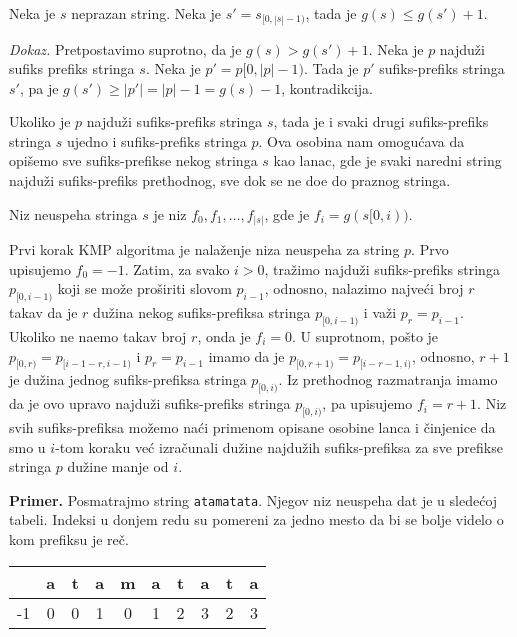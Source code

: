 \begin{thm}
\label{sufiksprefiksteorema}
Neka je $s$ neprazan string. Neka je $s' = s_{[0, |s|-1)}$, tada je $g(s) \leq g(s') + 1$.
\end{thm}

\textit{Dokaz.} Pretpostavimo suprotno, da je $g(s) > g(s') + 1$. Neka je $p$ najdu\v zi sufiks prefiks stringa $s$. Neka je $p' = p[0, |p|-1)$. Tada je $p'$ sufiks-prefiks stringa $s'$, pa je $g(s') \geq |p'| = |p| - 1 = g(s) - 1$, kontradikcija.

Ukoliko je $p$ najdu\v zi sufiks-prefiks stringa $s$, tada je i svaki drugi sufiks-prefiks stringa $s$ ujedno i sufiks-prefiks stringa $p$. Ova osobina nam omogu\' cava da opi\v semo sve sufiks-prefikse nekog stringa $s$ kao lanac, gde je svaki naredni string najdu\v zi sufiks-prefiks prethodnog, sve dok se ne do\dj e do praznog stringa.

\begin{dfn}
Niz neuspeha stringa $s$ je niz $f_0, f_1, \ldots, f_{|s|}$, gde je $f_i = g(s[0, i))$.
\end{dfn}

Prvi korak KMP algoritma je nala\v zenje niza neuspeha za string $p$. Prvo upisujemo $f_0 = -1$. Zatim, za svako $i > 0$, tra\v zimo najdu\v zi sufiks-prefiks stringa $p_{[0, i-1)}$ koji se mo\v ze pro\v siriti slovom $p_{i-1}$, odnosno, nalazimo najve\' ci broj $r$ takav da je $r$ du\v zina nekog sufiks-prefiksa stringa $p_{[0, i-1)}$ i va\v zi $p_r = p_{i-1}$. Ukoliko ne na\dj emo takav broj $r$, onda je $f_i = 0$. U suprotnom, po\v sto je $p_{[0, r)} = p_{[i-1-r, i-1)}$ i $p_r = p_{i-1}$ imamo da je $p_{[0, r+1)} = p_{[i-r-1, i)}$, odnosno, $r+1$ je du\v zina jednog sufiks-prefiksa stringa $p_{[0, i)}$. Iz prethodnog razmatranja imamo da je ovo upravo najdu\v zi sufiks-prefiks stringa $p_{[0,i)}$, pa upisujemo $f_i = r+1$. Niz svih sufiks-prefiksa mo\v zemo na\' ci primenom opisane osobine lanca i \v cinjenice da smo u $i$-tom koraku ve\' c izra\v cunali du\v zine najdu\v zih sufiks-prefiksa za sve prefikse stringa $p$ du\v zine manje od $i$.

\noindent \textbf{Primer.} Posmatrajmo string \texttt{atamatata}. Njegov niz neuspeha dat je u slede\' coj tabeli. Indeksi u donjem redu su pomereni za jedno mesto da bi se bolje videlo o kom prefiksu je re\v c.
\begin{center}
\begin{tabular}{|c|c|c|c|c|c|c|c|c|c|}
    \hline
    & a & t & a & m & a & t & a & t & a \\
    \hline
 -1 & 0 & 0 & 1 & 0 & 1 & 2 & 3 & 2 & 3 \\
    \hline
\end{tabular}
\end{center}

